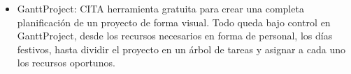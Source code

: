 \begin{itemize}
 \item GanttProject: CITA herramienta gratuita para crear una completa planificación de un proyecto de forma visual. Todo queda bajo control en GanttProject, desde los recursos necesarios en forma de personal, los días festivos, hasta dividir el proyecto en un árbol de tareas y asignar a cada uno los recursos oportunos.
\end{itemize}


